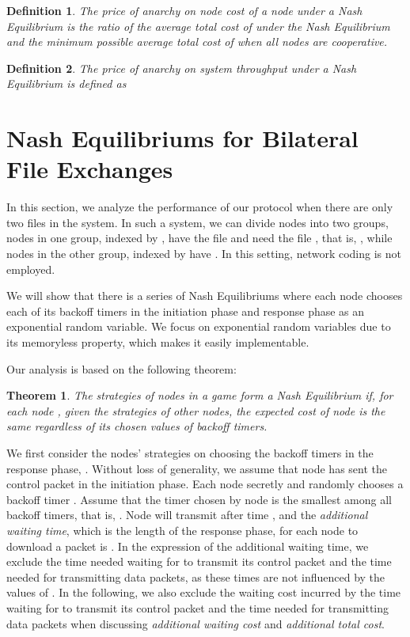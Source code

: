 \documentclass[11pt, conference]{IEEEtran}
\newtheorem{definition}{Definition}
\newtheorem{theorem}{Theorem}
\begin{document}
\begin{definition}
The \emph{price of anarchy on node cost} of a node  under a Nash Equilibrium is the ratio of the average total cost of  under the Nash Equilibrium and the minimum possible average total cost of  when all nodes are cooperative.
\end{definition}

\begin{definition}
The \emph{price of anarchy on system throughput} under a Nash Equilibrium is defined as 
\end{definition}






\section{Nash Equilibriums for Bilateral File Exchanges}	\label{section:bilateral}

In this section, we analyze the performance of our protocol when there are only two files in the system. In such a system, we can divide nodes into two groups, nodes in one group, indexed by , have the file  and need the file , that is, , while nodes in the other group, indexed by  have . In this setting, network coding is not employed.

We will show that there is a series of Nash Equilibriums where each node  chooses each of its backoff timers in the initiation phase and response phase as an exponential random variable. We focus on exponential random variables due to its memoryless property, which makes it easily implementable. 



Our analysis is based on the following theorem:

\begin{theorem}	\label{theorem:condition for NE} \cite[Lemma~3.1]{textbook}
The strategies of nodes in a game form a Nash Equilibrium if, for each node , given the strategies of other nodes, the expected cost of node  is the same regardless of its chosen values of backoff timers.
\end{theorem}

We first consider the nodes' strategies on choosing the backoff timers in the response phase, . Without loss of generality, we assume that node  has sent the control packet in the initiation phase. Each node  secretly and randomly chooses a backoff timer . Assume that the timer chosen by node  is the smallest among all backoff timers, that is, . Node  will transmit after time , and the \emph{additional waiting time}, which is the length of the response phase, for each node  to download a packet is . In the expression of the additional waiting time, we exclude the time needed waiting for  to transmit its control packet and the time needed for transmitting data packets, as these times are not influenced by the values of . In the following, we also exclude the waiting cost incurred by the time waiting for  to transmit its control packet and the time needed for transmitting data packets when discussing \emph{additional waiting cost} and \emph{additional total cost}.
\end{document}
